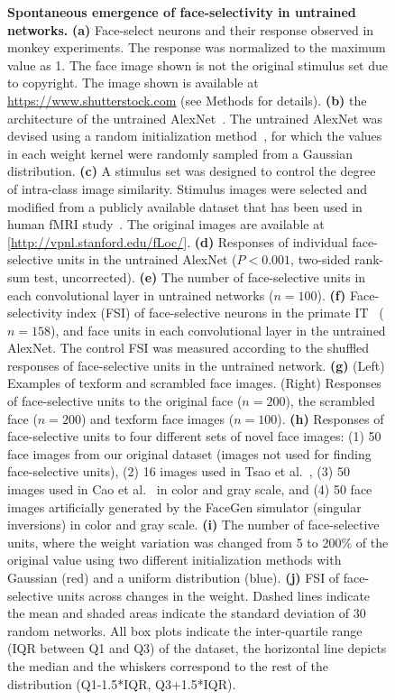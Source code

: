 \documentclass[final,3p,times,twocolumn]{elsarticle}
\begin{document}
\begin{figure}[htbp]
	\centering
	\caption{
		\textbf{Spontaneous emergence of face-selectivity in untrained networks.
		}
	\textbf{(a)} Face-select neurons and their response observed in monkey experiments.
	The response was normalized to the maximum value as 1.
	The face image shown is not the original stimulus set due to copyright.
	The image shown is available at \url{https://www.shutterstock.com} (see Methods for details).
	\textbf{(b)} the architecture of the untrained AlexNet~\cite{krizhevsky2012imagenet}.
	The untrained AlexNet was devised using a random initialization method~\cite{lecun2012efficient}, for which the values in each weight kernel were randomly sampled from a Gaussian distribution.
	\textbf{(c)} A stimulus set was designed to control the degree of intra-class image similarity.
	Stimulus images were selected and modified from a publicly available dataset that has been used in human fMRI study~\cite{stigliani2015temporal}.
	The original images are available at [\url{http://vpnl.stanford.edu/fLoc/}].
	\textbf{(d)} Responses of individual face-selective units in the untrained AlexNet ($ P < 0.001 $, two-sided rank-sum test, uncorrected).
	\textbf{(e)} The number of face-selective units in each convolutional layer in untrained networks ($ n=100 $).
	\textbf{(f)} Face-selectivity index (FSI) of face-selective neurons in the primate IT~\cite{freiwald2010functional} ($ n=158 $), and face units in each convolutional layer in the untrained AlexNet.
	The control FSI was measured according to the shuffled responses of face-selective units in the untrained network.
	\textbf{(g)} (Left) Examples of texform and scrambled face images.
	(Right) Responses of face-selective units to the original face ($ n = 200 $), the scrambled face ($ n=200 $) and texform face images ($ n = 100 $).
	\textbf{(h)} Responses of face-selective units to four different sets of novel face images: 
	(1) 50 face images from our original dataset (images not used for finding face-selective units),
	(2) 16 images used in Tsao et al.~\cite{tsao2006cortical,freiwald2010functional},
	(3) 50 images used in Cao et al.~\cite{cao2018vggface2} in color and gray scale,
	and (4) 50 face images artificially generated by the FaceGen simulator (singular inversions) in color and gray scale. %
	\textbf{(i)} The number of face-selective units, where the weight variation was changed from 5 to 200\% of the original value using two different initialization methods with Gaussian (red) and a uniform distribution (blue).
	\textbf{(j)} FSI of face-selective units across changes in the weight.
	Dashed lines indicate the mean and shaded areas indicate the standard deviation of 30 random networks.
	All box plots indicate the inter-quartile range (IQR between Q1 and Q3) of the dataset,
	the horizontal line depicts the median and the whiskers correspond to the rest of the distribution (Q1-1.5*IQR, Q3+1.5*IQR).
	}
	\label{fig:emergence}
\end{figure}
\end{document}
